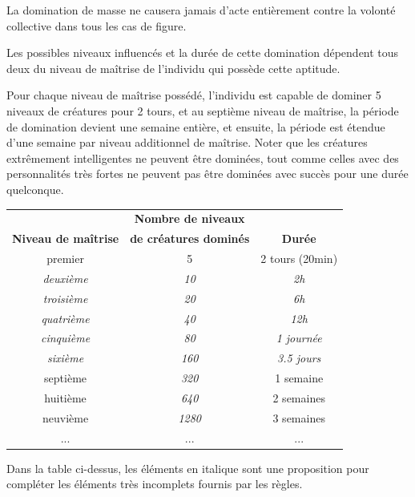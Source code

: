 \documentclass[11pt]{article}
\begin{document}
{\bigskip

La domination de masse ne causera jamais d'acte entièrement contre la volonté collective dans tous les cas de figure.

\bigskip

Les possibles niveaux influencés et la durée de cette domination dépendent tous deux du niveau de maîtrise de l'individu qui possède cette aptitude.

Pour chaque niveau de maîtrise possédé, l'individu est capable de dominer 5 niveaux de créatures pour 2 tours, et au septième niveau de maîtrise, la période de domination devient une semaine entière, et ensuite, la période est étendue d'une semaine par niveau additionnel de maîtrise. Noter que les créatures extrêmement intelligentes ne peuvent être dominées, tout comme celles avec des personnalités très fortes ne peuvent pas être dominées avec succès pour une durée quelconque.

\bigskip

\begin{tabular}{ccc}
                                 &\textbf{Nombre de niveaux} &\\
\textbf{Niveau de maîtrise}      & \textbf{de créatures dominés} & \textbf{Durée} \\
premier             & 5     & 2 tours (20min)      \\
\textit{deuxième}            & \textit{10}    & \textit{2h}                    \\
\textit{troisième}           & \textit{20}    & \textit{6h}                    \\
\textit{quatrième}           & \textit{40}    & \textit{12h}                   \\
\textit{cinquième}           & \textit{80}    & \textit{1 journée}                \\
\textit{sixième}             & \textit{160}   & \textit{3.5 jours} \\
septième   & \textit{320}   & 1 semaine \\
huitième            & \textit{640}   & 2 semaines \\
neuvième            & \textit{1280}  & 3 semaines \\
... & ... & ...
\end{tabular}

\bigskip

Dans la table ci-dessus, les éléments en italique sont une proposition pour compléter les éléments très incomplets fournis par les règles.

}
\end{document}
